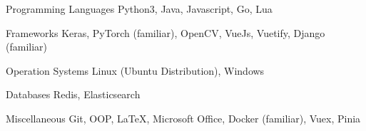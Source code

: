 

\begin{cvskills}

  \cvskill
    {Programming Languages} %
    {Python3, Java, Javascript, Go, Lua} %

  \cvskill
    {Frameworks} %
    {Keras, PyTorch (familiar), OpenCV, VueJs, Vuetify, Django (familiar)} %

  \cvskill
    {Operation Systems} %
    {Linux (Ubuntu Distribution), Windows} %

  \cvskill
    {Databases} %
    {Redis, Elasticsearch} %

  \cvskill
    {Miscellaneous} %
    {Git, OOP, \LaTeX, Microsoft Office, Docker (familiar), Vuex, Pinia} %

\end{cvskills}